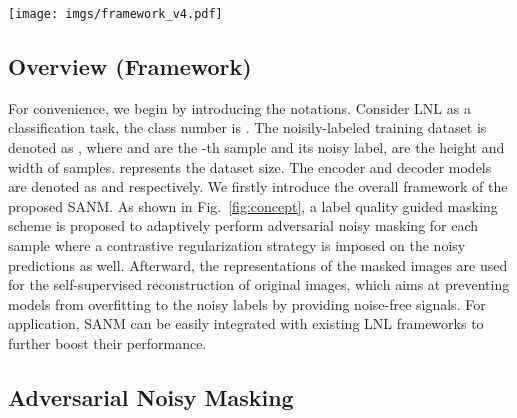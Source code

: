 \documentclass[10pt,twocolumn,letterpaper]{article}
\begin{document}
\begin{figure*}[!t]
\centering
\texttt{[image: imgs/framework\_v4.pdf]}
\vspace{-2em}
\caption{{The technical workflow of the proposed SANM. Three components are included in SANM: AMG (Adversarial Masking Generation), NLR (Noisy Label Regularization), SMR (Self-supervised Masking Reconstruction). In AMG and NLR, firstly feed the images to an encoder and generate activation maps. And a label quality guided adversarial masking strategy is proposed to modulate the images and noisy labels simultaneously. Further, an auxiliary decode branch is designed in SMR to reconstruct input images from the features of masked images. Finally, the generated modulated images and labels of SANM together with the reconstruction loss can be directly adopted for the training of existing LNL framework.}}
\label{fig:concept}
\vspace{-1em}
\end{figure*}


\subsection{Overview (Framework)}

For convenience, we begin by introducing the notations. Consider LNL as a classification task, the class number is . The noisily-labeled training dataset is denoted as , where  and  are the -th sample and its noisy label,  are the height and width of samples.  represents the dataset size. The encoder and decoder models are denoted as  and  respectively. We firstly introduce the overall framework of the proposed SANM. As shown in Fig.~\ref{fig:concept}, a label quality guided masking scheme is proposed to adaptively perform adversarial noisy masking for each sample where a contrastive regularization strategy is imposed on the noisy predictions as well. Afterward, the representations of the masked images are used for the self-supervised reconstruction of original images, which aims at preventing models from overfitting to the noisy labels by providing noise-free signals. For application, SANM can be easily integrated with existing LNL frameworks to further boost their performance.

\subsection{Adversarial Noisy Masking}
\end{document}
